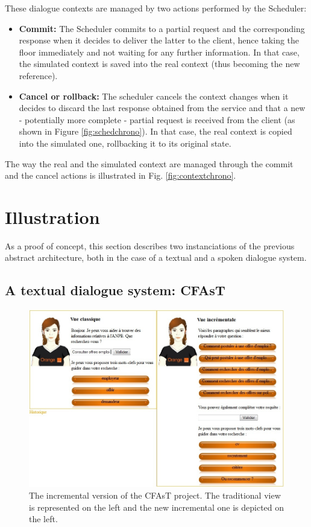         These dialogue contexts are managed by two actions performed by the Scheduler:
        
        \begin{itemize}
        	\item \textbf{Commit:} The Scheduler commits to a partial request and the corresponding response when it decides to deliver the latter to the client, hence taking the floor immediately and not waiting for any further information. In that case, the simulated context is saved into the real context (thus becoming the new reference).
            \item \textbf{Cancel or rollback:} The scheduler cancels the context changes when it decides to discard the last response obtained from the service and that a new - potentially more complete - partial request is received from the client (as shown in Figure \ref{fig:schedchrono}). In that case, the real context is copied into the simulated one, rollbacking it to its original state.
        \end{itemize}
 
 		The way the real and the simulated context are managed through the commit and the cancel actions is illustrated in Fig. \ref{fig:contextchrono}.

        
\section{Illustration}

        As a proof of concept, this section describes two instanciations of the previous abstract architecture, both in the case of a textual and a spoken dialogue system.

	\subsection{A textual dialogue system: CFAsT}
    
    	\begin{figure}[ht]
          \centering
          \includegraphics[scale=0.6]{figures/CFAsTIncr.jpg}
          \caption{The incremental version of the CFAsT project. The traditional view is represented on the left and the new incremental one is depicted on the left.}
          \label{fig:CFAsTIncr}
        \end{figure}
        
